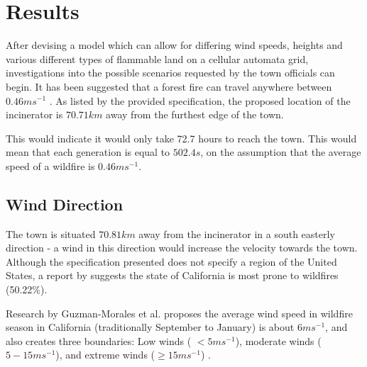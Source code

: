 \documentclass[11pt, a4paper, titlepage]{article}
\newcommand{\code}[1]{\colorbox{light-gray}{\texttt{#1}}}
\begin{document}
\section{Results}
After devising a model which can allow for differing wind speeds, heights and various different types of flammable land on a cellular automata grid, investigations into the possible scenarios requested by the town officials can begin. It has been suggested that a forest fire can travel anywhere between $0.46ms^{-1}$ \cite{viegas2009recent}. As listed by the provided specification, the proposed location of the incinerator is $70.71km$ away from the furthest edge of the town. 

This would indicate it would only take 72.7 hours to reach the town. This would mean that each generation is equal to $502.4s$, on the assumption that the average speed of a wildfire is $0.46ms^{-1}$.







  \subsection{Wind Direction}
  The town is situated $70.81km$ away from the incinerator in a south easterly direction - a wind in this direction would increase the velocity towards the town. Although the specification presented does not specify a region of the United States, a report by \cite{Thompson2011} suggests the state of California is most prone to wildfires (50.22\%). 
  
  Research by Guzman-Morales et al. proposes the average wind speed in wildfire season in California (traditionally September to January) is about $6ms^{-1}$, and also creates three boundaries: Low winds ( $< 5ms^{-1}$), moderate winds ($ 5 - 15 ms^{-1}$), and extreme winds ($ \geq 15ms^{-1}$) \cite{doi:10.1002/2016GL067887}. 
  
\end{document}

